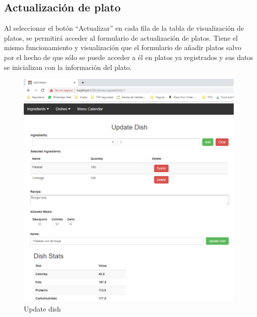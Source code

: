 \documentclass[12pt, a4paper, twoside]{book}
\begin{document}
	\subsection{Actualización de plato}
	Al seleccionar el botón ``Actualizar'' en cada fila de la tabla de visualización de platos, se permitirá acceder al formulario de actualización de platos. Tiene el mismo funcionamiento y visualización que el formulario de añadir platos salvo por el hecho de que sólo se puede acceder a él en platos ya registrados y sus datos se inicializan con la información del plato.
	\begin{figure}[H]
		\centering
		\includegraphics[width=15cm]{Imagenes/MU-UpdateDish.png}
		\caption{Update dish}\label{Update dish}
	\end{figure}
\end{document}
